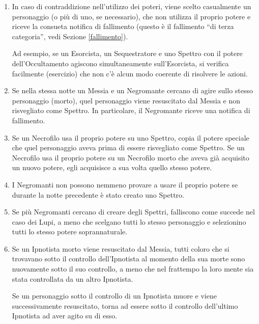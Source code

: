 \documentclass[a4paper,10pt]{article}
\begin{document}
\begin{enumerate}
 
 \item In caso di contraddizione nell'utilizzo dei poteri, viene scelto casualmente un personaggio (o più di uno, se necessario), che non utilizza il proprio potere e riceve la consueta notifica di fallimento (questo è il fallimento ``di terza categoria'', vedi Sezione \ref{fallimento}).
 
 Ad esempio, se un Esorcista, un Sequestratore e uno Spettro con il potere dell'Occultamento agiscono simultaneamente sull'Esorcista, si verifica facilmente (esercizio) che non c'è alcun modo coerente di risolvere le azioni.
  
 \item Se nella stessa notte un Messia e un Negromante cercano di agire sullo stesso personaggio (morto), quel personaggio viene resuscitato dal Messia e non risvegliato come Spettro. In particolare, il Negromante riceve una notifica di fallimento.

 \item Se un Necrofilo usa il proprio potere su uno Spettro, copia il potere speciale che quel personaggio aveva prima di essere risvegliato come Spettro.
 Se un Necrofilo usa il proprio potere su un Necrofilo morto che aveva già acquisito un nuovo potere, egli acquisisce a sua volta quello stesso potere.
 
 \item I Negromanti non possono nemmeno provare a usare il proprio potere se durante la notte precedente è stato creato uno Spettro.
 
 \item Se più Negromanti cercano di creare degli Spettri, falliscono come succede nel caso dei Lupi, a meno che scelgano tutti lo stesso personaggio e selezionino tutti lo stesso potere soprannaturale.

 \item Se un Ipnotista morto viene resuscitato dal Messia, tutti coloro che si trovavano sotto il controllo dell'Ipnotista al momento della sua morte sono nuovamente sotto il suo controllo, a meno che nel frattempo la loro mente sia stata controllata da un altro Ipnotista.
 
 Se un personaggio sotto il controllo di un Ipnotista muore e viene successivamente resuscitato, torna ad essere sotto il controllo dell'ultimo Ipnotista ad aver agito su di esso.
 

\end{enumerate}
\end{document}
